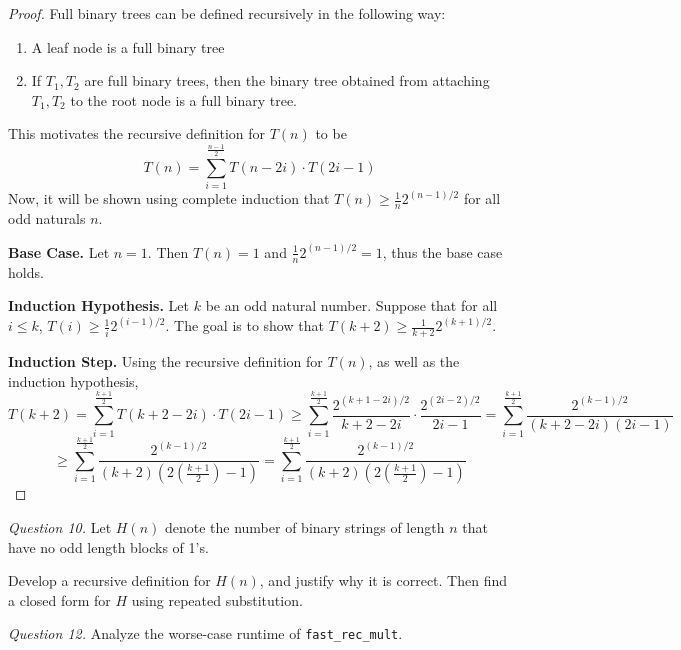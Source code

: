\documentclass[11pt]{article}
\begin{document}
    \begin{proof}
        Full binary trees can be defined recursively in the following way:
        \begin{enumerate}
            \item A leaf node is a full binary tree
            \item If \(T_1,T_2\) are full binary trees, then the binary tree obtained from attaching \(T_1,T_2\) to the root node is a full binary tree.
        \end{enumerate}
        This motivates the recursive definition for \(T(n)\) to be
        \[
            T(n) = \sum_{i=1}^{\frac{n-1}{2}} T(n-2i) \cdot T(2i - 1)
        \]
        Now, it will be shown using complete induction that \(T(n)\geq \frac{1}{n}2^{(n-1) / 2}\) for all odd naturals \(n\).

        \textbf{Base Case.} Let \(n=1\). Then \(T(n) = 1\) and \(\frac{1}{n}2^{(n-1) / 2} = 1\), thus the base case holds.

        \textbf{Induction Hypothesis.} Let \(k\) be an odd natural number. Suppose that for all \(i \leq k\), \(T(i) \geq \frac{1}{i}2^{(i-1) / 2}\). The goal is to show that \(T(k+2) \geq \frac{1}{k+2}2^{(k+1) / 2}\).

        \textbf{Induction Step.} Using the recursive definition for \(T(n)\), as well as the induction hypothesis,
        \[
            T(k+2) = \sum_{i=1}^{\frac{k+1}{2}} T(k+2-2i) \cdot T(2i - 1) \geq \sum_{i=1}^{\frac{k+1}{2}} \frac{2^{(k+1-2i) / 2}}{k+2-2i} \cdot \frac{2^{(2i-2) / 2}}{2i-1} = \sum_{i=1}^{\frac{k+1}{2}} \frac{2^{(k-1) / 2}}{(k+2-2i) (2i-1)}
        \]
        \[
            \geq \sum_{i=1}^{\frac{k+1}{2}} \frac{2^{(k-1) / 2}}{(k+2) (2(\frac{k+1}{2})-1)} = \sum_{i=1}^{\frac{k+1}{2}} \frac{2^{(k-1) / 2}}{(k+2) (2(\frac{k+1}{2})-1)}
        \]
    \end{proof}

    \textit{Question 10.} Let \(H(n)\) denote the number of binary strings of length \(n\) that have no odd length blocks of 1's.

    Develop a recursive definition for \(H(n)\), and justify why it is correct. Then find a closed form for \(H\) using repeated substitution.



    \textit{Question 12.} Analyze the worse-case runtime of \verb|fast_rec_mult|.
\end{document}
